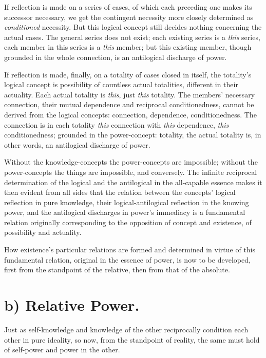 \documentclass[12pt]{book}
\begin{document}
If reflection is made on a series of cases, of which each preceding
one makes its successor necessary, we get the contingent necessity
more closely determined as \emph{conditioned} necessity. But this
logical concept still decides nothing concerning the actual cases.
The general series does not exist; each existing series is a
\emph{this} series, each member in this series is a \emph{this}
member; but this existing member, though grounded in the whole
connection, is an antilogical discharge of power.

If reflection is made, finally, on a totality of cases closed in
itself, the totality's logical concept is possibility
of countless actual totalities, different in their actuality. Each
actual totality is \emph{this}, just \emph{this} totality. The
members' necessary connection, their mutual dependence and
reciprocal conditionedness, cannot be derived from the logical
concepts: connection, dependence, conditionedness. The connection is
in each totality \emph{this} connection with \emph{this} dependence,
\emph{this} conditionedness; grounded in the power-concept:
totality, the actual totality is, in other words, an antilogical
discharge of power.

Without the knowledge-concepts the power-concepts are impossible;
without the power-concepts the things are impossible, and
conversely. The infinite reciprocal determination of the logical and
the antilogical in the all-capable essence makes it then evident
from all sides that the relation between the concepts' logical
reflection in pure knowledge, their logical-antilogical reflection
in the knowing power, and the antilogical discharges in power's
immediacy is a fundamental relation originally corresponding to the
opposition of concept and existence, of possibility and actuality.

How existence's particular relations are formed and determined in
virtue of this fundamental relation, original in the essence of
power, is now to be developed, first from the standpoint of the
relative, then from that of the absolute.

\section*{b) Relative Power.}

Just as self-knowledge and knowledge of the other reciprocally
condition each other in pure ideality, so now, from the standpoint
of reality, the same must hold of self-power and power in the other.
\end{document}
